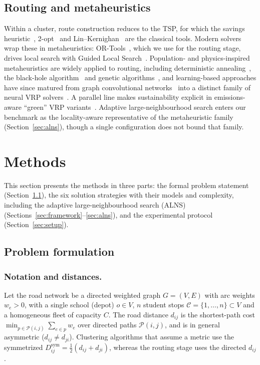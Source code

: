 \documentclass[graybox]{SNmult}
\begin{document}
\subsection{Routing and metaheuristics}
Within a cluster, route construction reduces to the TSP, for which the
savings heuristic~\cite{ClarkeWright1964Savings}, 2-opt~\cite{Croes1958TwoOpt}
and Lin--Kernighan~\cite{HelsgaunAnHeuristic} are the classical tools.
Modern solvers wrap these in metaheuristics: OR-Tools~\cite{PerronFurnon2023ORTools},
which we use for the routing stage, drives local search with Guided Local
Search~\cite{Voudouris1999GLS}. Population- and physics-inspired
metaheuristics are widely applied to routing, including deterministic
annealing~\cite{Baranwal2016DAVRPTW}, the black-hole
algorithm~\cite{Hatamlou2018BlackHole} and genetic
algorithms~\cite{Holland1992Adaptation}, and learning-based approaches
have since matured from graph convolutional
networks~\cite{Joshi2019GCN,Dahiya2018TSPReview} into a distinct family of
neural VRP solvers~\cite{Wu2024NCOSurvey}. A parallel line makes
sustainability explicit in emissions-aware ``green'' VRP
variants~\cite{Sabet2022GreenVRP}. Adaptive large-neighbourhood search
enters our benchmark as the locality-aware representative of the
metaheuristic family (Section~\ref{sec:alns}), though a single
configuration does not bound that family.

\section{Methods}\label{sec:methods}
This section presents the methods in three parts: the formal problem
statement (Section~\ref{sec:problem}), the six solution strategies
with their models and complexity, including the adaptive
large-neighbourhood search (ALNS)
(Sections~\ref{sec:framework}--\ref{sec:alns}), and the experimental
protocol (Section~\ref{sec:setup}).

\subsection{Problem formulation}\label{sec:problem}
\subsubsection{Notation and distances.}
Let the road network be a directed weighted graph $G=(V,E)$ with arc
weights $w_e>0$, with a single school (depot) $o\in V$, $n$ student stops
$\mathcal{C}=\{1,\dots,n\}\subset V$ and a homogeneous fleet of capacity
$C$. The road distance $d_{ij}$ is the shortest-path cost
$\min_{p\in\mathcal{P}(i,j)}\sum_{e\in p} w_e$ over directed paths
$\mathcal{P}(i,j)$, and is in general asymmetric
($d_{ij}\neq d_{ji}$). Clustering algorithms that assume a metric use the
symmetrized $D^{\mathrm{sym}}_{ij}=\tfrac{1}{2}(d_{ij}+d_{ji})$, whereas
the routing stage uses the directed $d_{ij}$.
\end{document}
